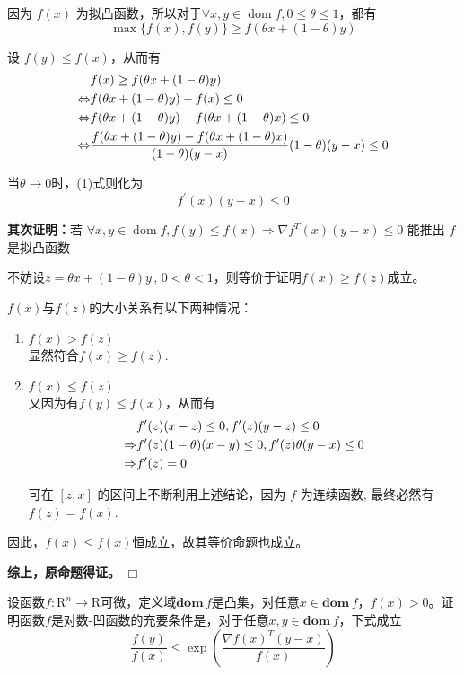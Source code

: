 \documentclass[10pt, a4paper]{article}
\begin{document}
因为 $f(x)$ 为拟凸函数，所以对于$\forall x, y \in \operatorname{dom} f, 0 \leq \theta \leq 1$，都有
\[\max \{f(x), f(y)\} \geq f(\theta x+(1-\theta) y)\]

设 $f(y) \leq f(x)$，从而有
\begin{align}
    &f(x) \geq f(\theta x+(1-\theta) y) \notag \\
    \Leftrightarrow &f(\theta x+(1-\theta) y)-f(x) \leq 0 \notag \\
    \Leftrightarrow &f(\theta x+(1-\theta) y)-f(\theta x+(1-\theta) x) \leq 0 \notag \\
    \Leftrightarrow &\frac{f(\theta x+(1-\theta) y)-f(\theta x+(1-\theta) x)}{(1-\theta)(y-x)}(1-\theta)(y-x) \leq 0 
\end{align}

当$\theta \to 0 $时，(1)式则化为
\[f^{\prime}(x)(y-x) \leq 0\]

\textbf{其次证明：}若 $\forall x, y \in \operatorname{dom} f, f(y) \leq f(x) \Rightarrow \nabla f^{T}(x)(y-x) \leq 0$ 能推出 $f$ 是拟凸函数

不妨设$z=\theta x+(1-\theta) y\,,\,0<\theta<1$，则等价于证明$f(x) \geq f(z)$成立。
\vspace*{1em}

$f(x)$与$f(z)$的大小关系有以下两种情况：
\begin{enumerate}[1)]
    \item \textbf{$f(x)>f(z)$}\\显然符合$f(x) \geq f(z)$.
    \item \textbf{$f(x) \leq f(z)$}\\又因为有$f(y) \leq f(x)$，从而有
    \begin{align}
        &f^{\prime}(z)(x-z) \leq 0, f^{\prime}(z)(y-z) \leq 0 \notag \\
        \Rightarrow &f^{\prime}(z)(1-\theta)(x-y) \leq 0, f^{\prime}(z) \theta(y-x) \leq 0 \notag \\
        \Rightarrow &f^{\prime}(z)=0 \notag
    \end{align}

    可在 $[z, x]$ 的区间上不断利用上述结论，因为 $f$ 为连续函数, 最终必然有 $f(z)=f(x)$.
\end{enumerate}

因此，$f(x) \leq f(x)$恒成立，故其等价命题也成立。
\vspace*{1em}

\textbf{综上，原命题得证。}
\hfill $\Box$
\vspace*{3em}

\begin{Problem}
设函数$f:\mathrm {R} ^{n}\longrightarrow \mathrm {R}  $可微，定义域$\textbf{dom}\,f$是凸集，对任意$x\in \textbf{dom}\,f$，$f(x)>0$。证明函数$f$是对数-凹函数的充要条件是，对于任意$x,y\in \textbf{dom}\,f$，下式成立
\[\frac{f(y)}{f(x)} \leq \exp \left(\frac{\nabla f(x)^{T}(y-x)}{f(x)}\right)\]
\end{Problem}
\end{document}
